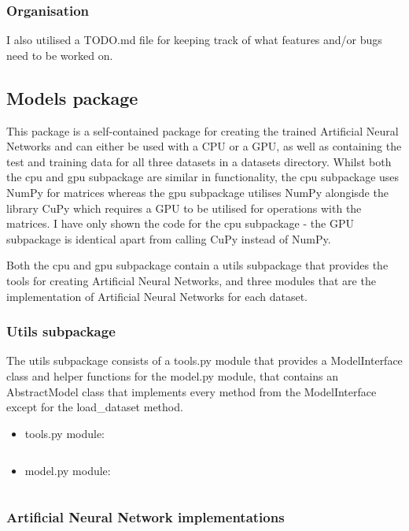 \documentclass[./project-report/src/latex/project-report.tex]{subfiles}
\begin{document}
\subsubsection{Organisation}

I also utilised a TODO.md file for keeping track of what features and/or bugs need to be worked on.

\subsection{Models package}

This package is a self-contained package for creating the trained Artificial Neural Networks and can either be used with a CPU or a GPU, as well as containing the test 
and training data for all three datasets in a datasets directory. Whilst both the cpu and gpu subpackage are similar in functionality, the cpu subpackage uses NumPy 
for matrices whereas the gpu subpackage utilises NumPy alongisde the library CuPy which requires a GPU to be utilised for operations with the matrices. I have only shown the 
code for the cpu subpackage - the GPU subpackage is identical apart from calling CuPy instead of NumPy.

Both the cpu and gpu subpackage contain a utils subpackage that provides the tools for creating Artificial Neural Networks, and three modules that are the implementation 
of Artificial Neural Networks for each dataset.

\subsubsection{Utils subpackage}
\label{sec:utils-subpackage}

The utils subpackage consists of a tools.py module that provides a ModelInterface class and helper functions for the model.py module, that contains an AbstractModel 
class that implements every method from the ModelInterface except for the load\_dataset method.

\begin{itemize}
    \item tools.py module:
        \inputminted{python}{./school_project/models/cpu/utils/tools.py}
    \item model.py module:
        \label{sec:model-module}
        \inputminted{python}{./school_project/models/cpu/utils/model.py}
\end{itemize}

\subsubsection{Artificial Neural Network implementations}
\label{sec:ann-implementations}
\end{document}
